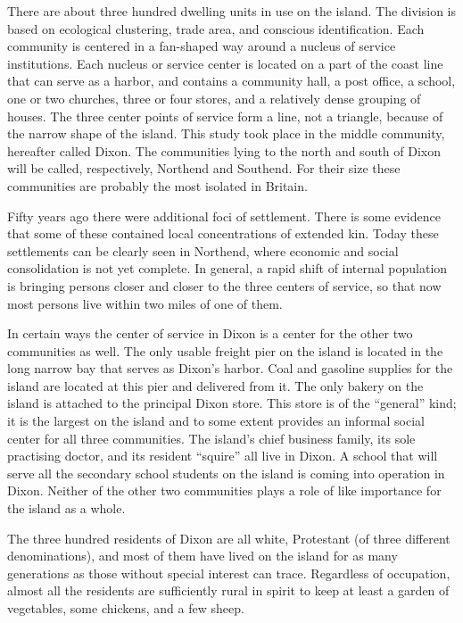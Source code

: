 \documentclass[openany,nobib]{tufte-book}
\begin{document}
There are about three hundred dwelling units in use on the island. The
division is based on ecological clustering, trade area, and conscious
identification. Each community is centered in a fan-shaped way around a
nucleus of service institutions. Each nucleus or service center is
located on a part of the coast line that can serve as a harbor, and
contains a community hall, a post office, a school, one or two churches,
three or four stores, and a relatively dense grouping of houses. The
three center points of service form a line, not a triangle, because of
the narrow shape of the island. This study took place in the middle
community, hereafter called Dixon. The communities lying to the north
and south of Dixon will be called, respectively, Northend and Southend.
For their size these communities are probably the most isolated in
Britain.

Fifty years ago there were additional foci of settlement. There is some
evidence that some of these contained local concentrations of extended
kin. Today these settlements can be clearly seen in Northend, where
economic and social consolidation is not yet complete. In general, a
rapid shift of internal population is bringing persons closer and closer
to the three centers of service, so that now most persons live within
two miles of one of them.

In certain ways the center of service in Dixon is a center for the other
two communities as well. The only usable freight pier on the island is
located in the long narrow bay that serves as Dixon's harbor. Coal and
gasoline supplies for the island are located at this pier and delivered
from it. The only bakery on the island is attached to the principal
Dixon store. This store is of the ``general'' kind; it is the largest on
the island and to some extent provides an informal social center for all
three communities. The island's chief business family, its sole
practising doctor, and its resident ``squire'' all live in Dixon. A
school that will serve all the secondary school students on the island
is coming into operation in Dixon. Neither of the other two communities
plays a role of like importance for the island as a whole.

The three hundred residents of Dixon are all white, Protestant (of three
different denominations), and most of them have lived on the island for
as many generations as those without special interest can trace.
Regardless of occupation, almost all the residents are sufficiently
rural in spirit to keep at least a garden of vegetables, some chickens,
and a few sheep.
\end{document}
